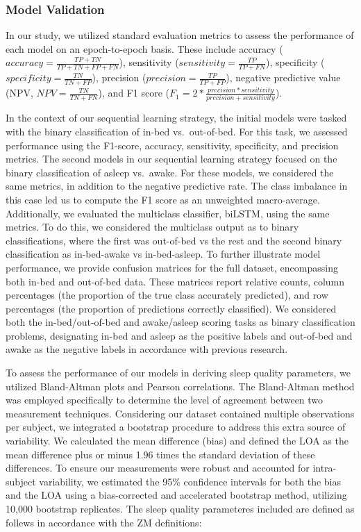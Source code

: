 \documentclass[
  super,
  preprint,
  3p]{elsarticle}
\begin{document}
\hypertarget{model-validation}{%
\subsubsection{Model Validation}\label{model-validation}}

In our study, we utilized standard evaluation metrics to assess the
performance of each model on an epoch-to-epoch basis. These include
accuracy (\(accuracy = \frac{TP+TN}{TP+TN+FP+FN}\)), sensitivity
(\(sensitivity = \frac{TP}{TP+FN}\)), specificity
(\(specificity = \frac{TN}{TN+FP}\)), precision
(\(precision = \frac{TP}{TP+FP}\)), negative predictive value (NPV,
\(NPV = \frac{TN}{TN + FN}\)), and F1 score
(\(F_1 = 2 * \frac{precision * sensitivity}{precision + sensitivity}\)).

In the context of our sequential learning strategy, the initial models
were tasked with the binary classification of in-bed vs.~out-of-bed. For
this task, we assessed performance using the F1-score, accuracy,
sensitivity, specificity, and precision metrics. The second models in
our sequential learning strategy focused on the binary classification of
asleep vs.~awake. For these models, we considered the same metrics, in
addition to the negative predictive rate. The class imbalance in this
case led us to compute the F1 score as an unweighted macro-average.
Additionally, we evaluated the multiclass classifier, biLSTM, using the
same metrics. To do this, we considered the multiclass output as to
binary classifications, where the first was out-of-bed vs the rest and
the second binary classification as in-bed-awake vs in-bed-asleep. To
further illustrate model performance, we provide confusion matrices for
the full dataset, encompassing both in-bed and out-of-bed data. These
matrices report relative counts, column percentages (the proportion of
the true class accurately predicted), and row percentages (the
proportion of predictions correctly classified). We considered both the
in-bed/out-of-bed and awake/asleep scoring tasks as binary
classification problems, designating in-bed and asleep as the positive
labels and out-of-bed and awake as the negative labels in accordance
with previous research\citep{hjorth2012, kushida2001}.

To assess the performance of our models in deriving sleep quality
parameters, we utilized Bland-Altman plots and Pearson correlations. The
Bland-Altman method was employed specifically to determine the level of
agreement between two measurement techniques. Considering our dataset
contained multiple observations per subject, we integrated a bootstrap
procedure to address this extra source of variability. We calculated the
mean difference (bias) and defined the LOA as the mean difference plus
or minus 1.96 times the standard deviation of these differences. To
ensure our measurements were robust and accounted for intra-subject
variability, we estimated the 95\% confidence intervals for both the
bias and the LOA using a bias-corrected and accelerated bootstrap
method, utilizing 10,000 bootstrap replicates. The sleep quality
parameteres included are defined as follews in accordance with the ZM
definitions:
\end{document}
